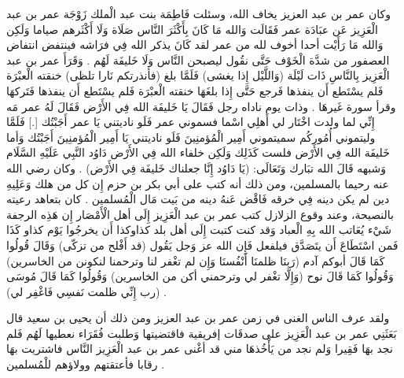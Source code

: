 وكان عمر بن عبد العزيز يخاف الله، وسئلت فَاطِمَة بنت عبد الْملك زَوْجَة عمر بن عبد الْعَزِيز عَن عبَادَة عمر فَقَالَت وَالله مَا كَانَ بِأَكْثَرَ النَّاس صَلَاة وَلَا أَكْثَرهم صياما وَلَكِن وَالله مَا رَأَيْت أحدا أخوف لله من عمر لقد كَانَ يذكر الله فِي فرَاشه فينتفض انتفاض العصفور من شدَّة الْخَوْف حَتَّى نقُول ليصبحن النَّاس وَلَا خَليفَة لَهُم \cite{ibnAbdAlHakam_OmarIbnAbdAlAziz}. وَقَرَأَ عمر بن عبد الْعَزِيز بِالنَّاسِ ذَات لَيْلَة (وَاللَّيْل إِذا يغشى) فَلَمَّا بلغ (فأنذرتكم نَارا تلظى) خنقته الْعبْرَة فَلم يسْتَطع أَن ينفذها فَرجع حَتَّى إِذا بلغَهَا خنقته الْعبْرَة فَلم يسْتَطع أَن ينفذها فَتَركهَا وقرأ سورة غَيرهَا \cite{ibnAbdAlHakam_OmarIbnAbdAlAziz}. وذات يوم ناداه رجل فَقَالَ يَا خَليفَة الله فِي الأَرْض فَقَالَ لَهُ عمر مَه إِنِّي لما ولدت اخْتَار لي أَهلِي اسْما فسموني عمر فَلَو ناديتني يَا عمر أَجَبْتُك [.]  فَلَمَّا وليتموني أُمُوركُم سميتموني أَمِير الْمُؤمنِينَ فَلَو ناديتني يَا أَمِير الْمُؤمنِينَ أَجَبْتُك وَأما خَليفَة الله فِي الأَرْض فلست كَذَلِك وَلَكِن خلفاء الله فِي الأَرْض دَاوُد النَّبِي عَلَيْهِ السَّلَام وَشبهه قَالَ الله تبَارك وَتَعَالَى: (يَا دَاوُد إِنَّا جعلناك خَليفَة فِي الأَرْض) \cite{ibnAbdAlHakam_OmarIbnAbdAlAziz}. وكان رضي الله عنه رحيما بالمسلمين، ومن ذلك أنه كتب على أبي بكر بن حزم إِن كل من هلك وَعَلِيهِ دين لم يكن دينه فِي خرقه فَاقْض عَنهُ دينه من بَيت مَال الْمُسلمين \cite{ibnAbdAlHakam_OmarIbnAbdAlAziz}. كان بتعاهد رعيته بالنصيحة، وعند وقوع الزلازل كتب عمر بن عبد الْعَزِيز إِلَى أهل الْأَمْصَار إِن هَذِه الرجفة شَيْء يُعَاتب الله بِهِ الْعباد وَقد كنت كتبت إِلَى أهل بلد كذاوكذا أَن يخرجُوا يَوْم كذاو كَذَا فَمن اسْتَطَاعَ أَن يتَصَدَّق فيلفعل فَإِن الله عز وَجل يَقُول (قد أَفْلح من تزكّى) وَقَالَ قُولُوا كَمَا قَالَ أبوكم آدم (رَبنَا ظلمنَا أَنْفُسنَا وَإِن لم تغْفر لنا وترحمنا لنكونن من الخاسرين) وَقُولُوا كَمَا قَالَ نوح (وَإِلَّا تغْفر لي وترحمني أكن من الخاسرين) وَقُولُوا كَمَا قَالَ مُوسَى (رب إِنِّي ظلمت نَفسِي فَاغْفِر لي) \cite{ibnAbdAlHakam_OmarIbnAbdAlAziz}.

ولقد عرف الناس الغنى في زمن عمر بن عبد العزيز ومن ذلك أن يحيى بن سعيد قال بَعَثَنِي عمر بن عبد الْعَزِيز على صدقَات إفريقية فاقتضيتها وَطلبت فُقَرَاء نعطيها لَهُم فَلم نجد بهَا فَقِيرا وَلم نجد من يَأْخُذهَا مني قد أغْنى عمر بن عبد الْعَزِيز النَّاس فاشتريت بهَا رقابا فأعتقتهم وولاؤهم للْمُسلمين \cite{ibnAbdAlHakam_OmarIbnAbdAlAziz}.



